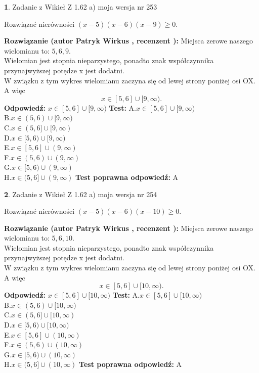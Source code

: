 \documentclass[12pt, a4paper]{article}
\theoremstyle{definition} %
\newtheorem{zad}{}
\newcommand{\zadStart}[1]{\begin{zad}#1\newline}
\newcommand{\zadStop}{\end{zad}}
\newcommand{\rozwStart}[2]{\noindent \textbf{Rozwiązanie (autor #1 , recenzent #2): }\newline}
\newcommand{\rozwStop}{\newline}
\newcommand{\odpStart}{\noindent \textbf{Odpowiedź:}\newline}
\newcommand{\odpStop}{\newline}
\newcommand{\testStart}{\noindent \textbf{Test:}\newline}
\newcommand{\testStop}{\newline}
\newcommand{\kluczStart}{\noindent \textbf{Test poprawna odpowiedź:}\newline}
\newcommand{\kluczStop}{\newline}
\begin{document}
\zadStart{Zadanie z Wikieł Z 1.62 a) moja wersja nr 253}

Rozwiązać nierówności $(x-5)(x-6)(x-9)\ge0$.
\zadStop
\rozwStart{Patryk Wirkus}{}
Miejsca zerowe naszego wielomianu to: $5, 6, 9$.\\
Wielomian jest stopnia nieparzystego, ponadto znak współczynnika przy\linebreak najwyższej potędze x jest dodatni.\\ W związku z tym wykres wielomianu zaczyna się od lewej strony poniżej osi OX. A więc $$x \in [5,6] \cup [9,\infty).$$
\rozwStop
\odpStart
$x \in [5,6] \cup [9,\infty)$
\odpStop
\testStart
A.$x \in [5,6] \cup [9,\infty)$\\
B.$x \in (5,6) \cup [9,\infty)$\\
C.$x \in (5,6] \cup [9,\infty)$\\
D.$x \in [5,6) \cup [9,\infty)$\\
E.$x \in [5,6] \cup (9,\infty)$\\
F.$x \in (5,6) \cup (9,\infty)$\\
G.$x \in [5,6) \cup (9,\infty)$\\
H.$x \in (5,6] \cup (9,\infty)$
\testStop
\kluczStart
A
\kluczStop



\zadStart{Zadanie z Wikieł Z 1.62 a) moja wersja nr 254}

Rozwiązać nierówności $(x-5)(x-6)(x-10)\ge0$.
\zadStop
\rozwStart{Patryk Wirkus}{}
Miejsca zerowe naszego wielomianu to: $5, 6, 10$.\\
Wielomian jest stopnia nieparzystego, ponadto znak współczynnika przy\linebreak najwyższej potędze x jest dodatni.\\ W związku z tym wykres wielomianu zaczyna się od lewej strony poniżej osi OX. A więc $$x \in [5,6] \cup [10,\infty).$$
\rozwStop
\odpStart
$x \in [5,6] \cup [10,\infty)$
\odpStop
\testStart
A.$x \in [5,6] \cup [10,\infty)$\\
B.$x \in (5,6) \cup [10,\infty)$\\
C.$x \in (5,6] \cup [10,\infty)$\\
D.$x \in [5,6) \cup [10,\infty)$\\
E.$x \in [5,6] \cup (10,\infty)$\\
F.$x \in (5,6) \cup (10,\infty)$\\
G.$x \in [5,6) \cup (10,\infty)$\\
H.$x \in (5,6] \cup (10,\infty)$
\testStop
\kluczStart
A
\kluczStop
\end{document}
